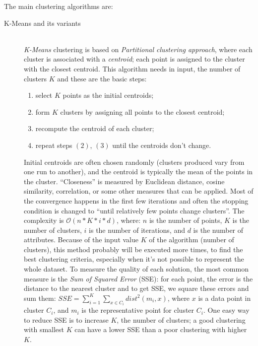 The main clustering algorithms are:
\begin{description}
	\item[K-Means and its variants] \hfill \\
	\emph{K-Means} clustering is based on \emph{Partitional clustering approach}, where each cluster is associated with a \emph{centroid}; each point is assigned to the cluster with the closest centroid.
	This algorithm needs in input, the number of clusters $K$ and these are the basic steps:
	\begin{enumerate}
		\item
		select $K$ points as the initial centroids;
		\item
		form $K$ clusters by assigning all points to the closest centroid;
		\item
		recompute the centroid of each cluster;
		\item
		repeat steps $(2)$, $(3)$ until the centroids don't change.
	\end{enumerate}
	Initial centroids are often chosen randomly (clusters produced vary from one run to another), and the centroid is typically the mean of the points in the cluster.
	``Closeness'' is measured by Euclidean distance, cosine similarity, correlation, or some other measures that can be applied.
	Most of the convergence happens in the first few iterations and often the stopping condition is changed to ``until relatively few points change clusters''.
	The complexity is $\mathcal{O}\left(n * K * i * d\right)$, where: $n$ is the number of points, $K$ is the number of clusters, $i$ is the number of iterations, and $d$ is the number of attributes.
	Because of the input value $K$ of the algorithm (number of clusters), this method probably will be executed more times, to find the best clustering criteria, especially when it's not possible to represent the whole dataset.
	To measure the quality of each solution, the most common measure is the \emph{Sum of Squared Error} (SSE): for each point, the error is the distance to the nearest cluster and to get SSE, we square these errors and sum them: $SSE = \sum_{i = 1}^{K} \sum_{x \in C_i} dist^2\left(m_i, x\right)$, where $x$ is a data point in cluster $C_i$, and $m_i$ is the representative point for cluster $C_i$.
	One easy way to reduce SSE is to increase $K$, the number of clusters; a good clustering with smallest $K$ can have a lower SSE than a poor clustering with higher $K$.


\end{description}
